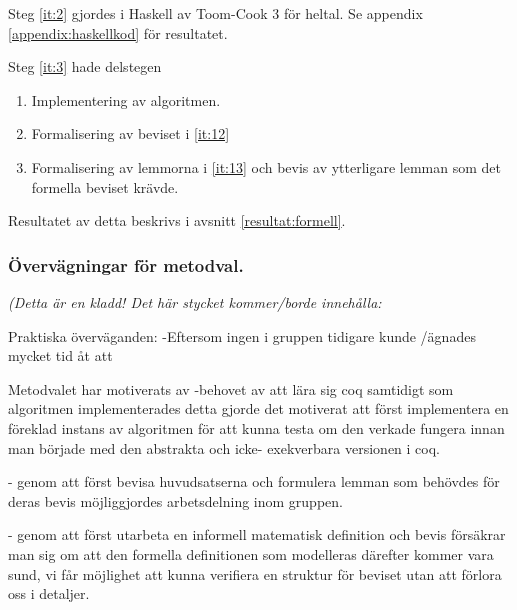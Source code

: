 Steg \ref{it:2} gjordes i Haskell av Toom-Cook 3 för heltal. Se appendix \ref{appendix:haskellkod} för resultatet.

Steg \ref{it:3} hade delstegen
\begin{enumerate}
 \item Implementering av algoritmen.
 \item Formalisering av beviset i \ref{it:12}
 \item Formalisering av lemmorna i \ref{it:13} och bevis av ytterligare lemman som det formella beviset krävde.
\end{enumerate}
Resultatet av detta beskrivs i avsnitt \ref{resultat:formell}.

\subsubsection{Övervägningar för metodval.}
\emph{(Detta är en kladd! Det här stycket kommer/borde innehålla: }

Praktiska överväganden:
-Eftersom ingen i gruppen tidigare kunde \coq/\ssr ägnades mycket tid åt att

Metodvalet har motiverats av
-behovet av att lära sig coq samtidigt som algoritmen implementerades
detta gjorde det motiverat att först implementera en föreklad instans av algoritmen för
att kunna testa om den verkade fungera innan man började med den abstrakta och icke-
exekverbara versionen i coq.

- genom att först bevisa huvudsatserna och formulera lemman som behövdes för deras bevis
möjliggjordes arbetsdelning inom gruppen.

- genom att först utarbeta en informell matematisk definition och bevis försäkrar man sig om
att den formella definitionen som modelleras därefter kommer vara sund, vi får möjlighet
att kunna verifiera en struktur för beviset utan att förlora oss i detaljer.
